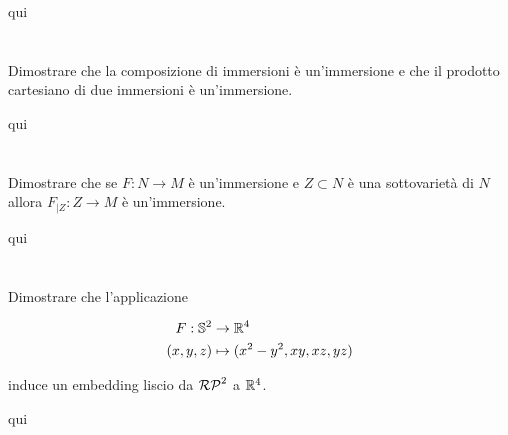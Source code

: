 qui

%

\newpage

%

\section{}\label{es2-21}

\begin{tcolorbox}
	Dimostrare che la composizione di immersioni è un’immersione e che il prodotto cartesiano di due immersioni è un’immersione.
\end{tcolorbox}

qui

%

\newpage

%

\section{}\label{es2-22}

\begin{tcolorbox}
	Dimostrare che se $ F : N \to M $ è un'immersione e $ Z \subset N $ è una sottovarietà di $ N $ allora $ F_{|Z} : Z \to M $ è un'immersione.
\end{tcolorbox}

qui

%

\newpage

%

\section{}\label{es2-23}

\begin{tcolorbox}
	Dimostrare che l'applicazione
	
	\begin{align}
		\begin{split}
			F : \mathbb{S}^{2} &\to \mathbb{R}^{4}\\
			(x,y,z) &\mapsto (x^{2}-y^{2},xy,xz,yz)
		\end{split}
	\end{align}
	
	induce un embedding liscio da $ \mathcal{RP}^{2} $ a $ \mathbb{R}^{4} $.
\end{tcolorbox}

qui

%

\newpage

%

